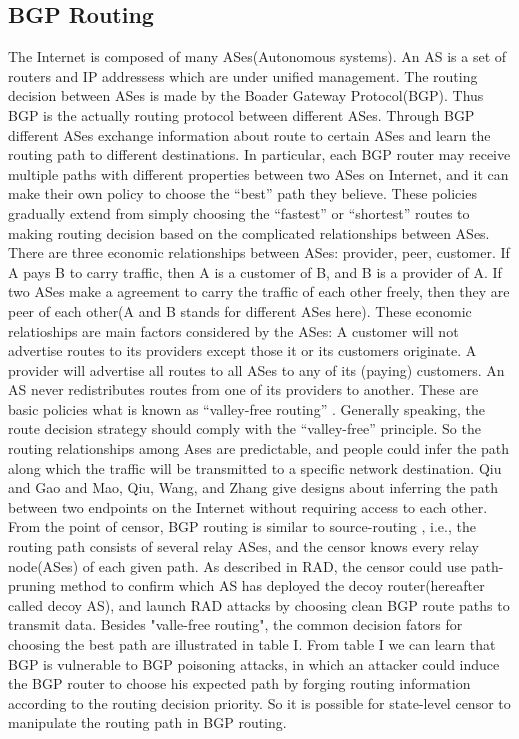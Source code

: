 \documentclass[conference]{IEEEtran}
\begin{document}
\subsection{BGP Routing}
The Internet is composed of many ASes(Autonomous systems). An AS is a set of routers and IP addressess which are under unified management. The routing decision between ASes is made by the Boader Gateway Protocol(BGP). Thus BGP is the actually routing protocol between different ASes. Through BGP different ASes exchange information about route to certain ASes and learn the routing path to different destinations. In particular, each BGP router may receive multiple paths  with different properties between two ASes on Internet, and it can make their own policy to choose the “best” path they believe. These policies gradually extend from simply choosing the “fastest” or “shortest” routes to making routing decision based on the complicated relationships between ASes. There are three economic relationships between ASes: provider, peer, customer. If A pays B to carry traffic, then A is a customer of B, and B is a provider of A. If two ASes make a agreement to carry the traffic of each other freely, then they are peer of each other(A and B stands for different ASes here). These economic relatioships are main factors considered by the ASes: A customer will not advertise routes to its providers except those it or its customers originate. A provider will advertise all routes to all ASes to any of its (paying) customers. An AS never redistributes routes from one of its providers to another. These are basic policies what is known as “valley-free routing” \cite{valley}. Generally speaking, the route decision strategy should comply with the “valley-free” principle. So the routing relationships among Ases are predictable, and people could infer the path along which the traffic will be transmitted to a specific network destination. Qiu and Gao\cite{path1} and Mao, Qiu, Wang, and Zhang\cite{path2} give designs about inferring the path between two endpoints on the Internet without requiring access to each other. From the point of censor, BGP routing is similar to source-routing , i.e., the routing path consists of several relay ASes, and the censor knows every relay node(ASes) of each given path. As described in RAD, the censor could use path-pruning method to confirm which AS has deployed the decoy router(hereafter called decoy AS), and launch RAD attacks by choosing clean BGP route paths to transmit data. Besides "valle-free routing", the common decision fators for choosing the best path are illustrated in table I. From table I we can learn that BGP is vulnerable to BGP poisoning attacks, in which an attacker could induce the BGP router to choose his expected path by forging routing information according to the routing decision priority. So it is possible for state-level censor to manipulate the routing path in BGP routing.
\end{document}
